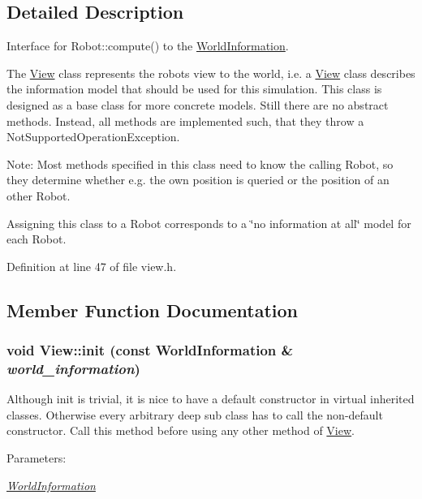 \subsection{Detailed Description}
Interface for Robot::compute() to the \hyperlink{class_world_information}{WorldInformation}. 

The \hyperlink{class_view}{View} class represents the robots view to the world, i.e. a \hyperlink{class_view}{View} class describes the information model that should be used for this simulation. This class is designed as a base class for more concrete models. Still there are no abstract methods. Instead, all methods are implemented such, that they throw a NotSupportedOperationException.

Note: Most methods specified in this class need to know the calling Robot, so they determine whether e.g. the own position is queried or the position of an other Robot.

Assigning this class to a Robot corresponds to a \char`\"{}no information at all\char`\"{} model for each Robot. 

Definition at line 47 of file view.h.

\subsection{Member Function Documentation}
\hypertarget{class_view_fa489c0530d45e3e24c3151c0908240d}{
\subsubsection[init]{\setlength{\rightskip}{0pt plus 5cm}void View::init (const {\bf WorldInformation} \& {\em world\_\-information})}}
\label{class_view_fa489c0530d45e3e24c3151c0908240d}


Although init is trivial, it is nice to have a default constructor in virtual inherited classes. Otherwise every arbitrary deep sub class has to call the non-default constructor. Call this method before using any other method of \hyperlink{class_view}{View}. \begin{Desc}
\item[Parameters:]
\begin{description}
\item[{\em \hyperlink{class_world_information}{WorldInformation}}]\end{description}
\end{Desc}


